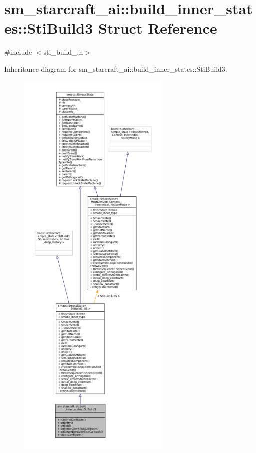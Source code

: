 \hypertarget{structsm__starcraft__ai_1_1build__inner__states_1_1StiBuild3}{}\section{sm\+\_\+starcraft\+\_\+ai\+:\+:build\+\_\+inner\+\_\+states\+:\+:Sti\+Build3 Struct Reference}
\label{structsm__starcraft__ai_1_1build__inner__states_1_1StiBuild3}


{\ttfamily \#include $<$sti\+\_\+build\+\_.\+h$>$}



Inheritance diagram for sm\+\_\+starcraft\+\_\+ai\+:\+:build\+\_\+inner\+\_\+states\+:\+:Sti\+Build3\+:
\nopagebreak
\begin{figure}[H]
\begin{center}
\leavevmode
\includegraphics[height=550pt]{structsm__starcraft__ai_1_1build__inner__states_1_1StiBuild3__inherit__graph}
\end{center}
\end{figure}


